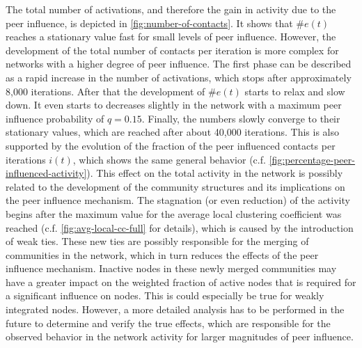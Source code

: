 The total number of activations, and therefore the gain in activity due to the peer influence, is depicted in \cref{fig:number-of-contacts}.
It shows that \( \#e(t) \) reaches a stationary value fast for small levels of peer influence.
However, the development of the total number of contacts per iteration is more complex for networks with a higher degree of peer influence.
The first phase can be described as a rapid increase in the number of activations, which stops after approximately 8,000 iterations.
After that the development of \( \#e(t) \) starts to relax and slow down.
It even starts to decreases slightly in the network with a maximum peer influence probability of \( q = 0.15 \).
Finally, the numbers slowly converge to their stationary values, which are reached after about 40,000 iterations.
This is also supported by the evolution of the fraction of the peer influenced contacts per iterations \( i(t) \), which shows the same general behavior (c.f. \cref{fig:percentage-peer-influenced-activity}).
This effect on the total activity in the network is possibly related to the development of the community structures and its implications on the peer influence mechanism.
The stagnation (or even reduction) of the activity begins after the maximum value for the average local clustering coefficient was reached (c.f. \cref{fig:avg-local-cc-full} for details), which is caused by the introduction of weak ties.
These new ties are possibly responsible for the merging of communities in the network, which in turn reduces the effects of the peer influence mechanism.
Inactive nodes in these newly merged communities may have a greater impact on the weighted fraction of active nodes that is required for a significant influence on nodes.
This is could especially be true for weakly integrated nodes.
However, a more detailed analysis has to be performed in the future to determine and verify the true effects, which are responsible for the observed behavior in the network activity for larger magnitudes of peer influence. 


